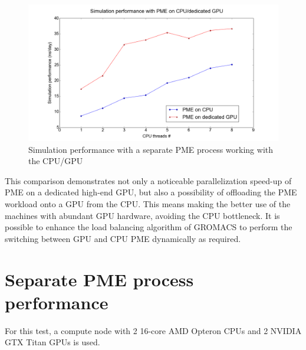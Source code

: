\documentclass[12pt,a4paper]{report}
\newcommand{\draft}[1]{#1}
\begin{document}
\FloatBarrier
\begin{figure} [h!]
    \centering
    \includegraphics[width=1\textwidth]{pics/CPU_GPU_ADH.png}
    \caption{Simulation performance with a separate PME process working with the CPU/GPU}
    \label{fig:sepGPUNEW}
\end{figure}
\FloatBarrier

This comparison demonstrates not only a noticeable parallelization speed-up of PME on a dedicated high-end GPU, but also a possibility of offloading the PME workload onto a GPU from the CPU. This means making the better use of the machines with abundant GPU hardware, avoiding the CPU bottleneck. It is possible to enhance the load balancing algorithm of GROMACS to perform the switching between GPU and CPU PME dynamically as required.


 
    
\iffalse

\section{Separate PME process performance}

For this test, a compute node with 2 16-core AMD Opteron CPUs and 2 NVIDIA GTX Titan GPUs is used.
\end{document}
